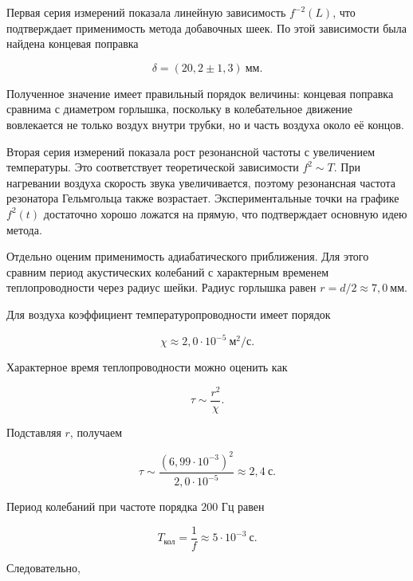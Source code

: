 \documentclass[12pt]{extreport}
\begin{document}
	Первая серия измерений показала линейную зависимость \(f^{-2}(L)\), что подтверждает применимость метода добавочных шеек. По этой зависимости была найдена концевая поправка
	
	\begin{equation*}
		\delta = (20,2 \pm 1,3)\ \text{мм}.
	\end{equation*}
	
	Полученное значение имеет правильный порядок величины: концевая поправка сравнима с диаметром горлышка, поскольку в колебательное движение вовлекается не только воздух внутри трубки, но и часть воздуха около её концов.
	
	Вторая серия измерений показала рост резонансной частоты с увеличением температуры. Это соответствует теоретической зависимости	$f^2 \sim T$. При нагревании воздуха скорость звука увеличивается, поэтому резонансная частота резонатора Гельмгольца также возрастает. Экспериментальные точки на графике \(f^2(t)\) достаточно хорошо ложатся на прямую, что подтверждает основную идею метода.
	
	Отдельно оценим применимость адиабатического приближения. Для этого сравним период акустических колебаний с характерным временем теплопроводности через радиус шейки. Радиус горлышка равен $r=d/2 \approx 7,0\ \text{мм}$.

	
	Для воздуха коэффициент температуропроводности имеет порядок
	
	\begin{equation*}
		\chi \approx 2,0\cdot10^{-5}\ \text{м}^2/\text{с}.
	\end{equation*}
	
	Характерное время теплопроводности можно оценить как
	
	\begin{equation*}
		\tau \sim \frac{r^2}{\chi}.
	\end{equation*}
	
	Подставляя \(r\), получаем
	
	\begin{equation*}
		\tau
		\sim
		\frac{(6,99\cdot10^{-3})^2}{2,0\cdot10^{-5}}
		\approx
		2,4\ \text{с}.
	\end{equation*}
	
	Период колебаний при частоте порядка \(200\) Гц равен
	
	\begin{equation*}
		T_{\text{кол}}=\frac{1}{f}\approx5\cdot10^{-3}\ \text{с}.
	\end{equation*}
	
	Следовательно,
	
\end{document}
